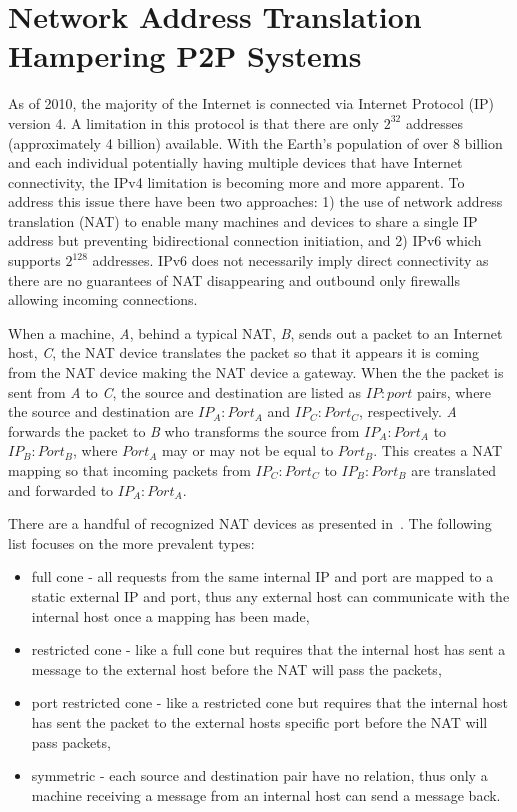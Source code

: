 \section{Network Address Translation Hampering P2P Systems}
As of 2010, the majority of the Internet is connected via Internet Protocol (IP)
version 4.  A limitation in this protocol is that there are only $2^{32}$
addresses (approximately 4 billion) available.  With the Earth's population of
over 8 billion and each individual potentially having multiple devices that
have Internet connectivity, the IPv4 limitation is becoming more and more
apparent.  To address this issue there have been two approaches:  1) the use of
network address translation (NAT) to enable many machines and devices to share
a single IP address but preventing bidirectional connection initiation, and 2)
IPv6 which supports $2^{128}$ addresses.  IPv6 does not necessarily imply
direct connectivity as there are no guarantees of NAT disappearing and outbound
only firewalls allowing incoming connections.

When a machine, \textit{A}, behind a typical NAT, \textit{B}, sends out a
packet to an Internet host, \textit{C}, the NAT device translates the packet so
that it appears it is coming from the NAT device making the NAT device a gateway.
When the the packet is sent from \textit{A} to \textit{C}, the source and
destination are listed as $IP:port$ pairs, where the source and destination are
$IP_A:Port_A$ and $IP_C:Port_C$, respectively.  \textit{A} forwards the packet
to \textit{B} who transforms the source from $IP_A:Port_A$ to $IP_B:Port_B$,
where $Port_A$ may or may not be equal to $Port_B$.  This creates a NAT mapping
so that incoming packets from $IP_C:Port_C$ to $IP_B:Port_B$ are translated and
forwarded to $IP_A:Port_A$.

There are a handful of recognized NAT devices as presented in~\cite{stun,
p2p_nats_rfc}.  The following list focuses on the more prevalent types:
\begin{itemize}
\item full cone - all requests from the same internal IP and port are mapped to
a static external IP and port, thus any external host can communicate with the
internal host once a mapping has been made,
\item restricted cone - like a full cone but requires that the internal host
has sent a message to the external host before the NAT will pass the packets,
\item port restricted cone - like a restricted cone but requires that the
internal host has sent the packet to the external hosts specific port before the
NAT will pass packets,
\item symmetric - each source and destination pair have no relation, thus only
a machine receiving a message from an internal host can send a message back.
\end{itemize}

